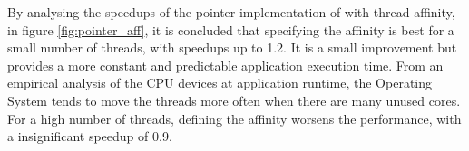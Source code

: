By analysing the speedups of the pointer implementation of \tth with thread affinity, in figure \ref{fig:pointer_aff}, it is concluded that specifying the affinity is best for a small number of threads, with speedups up to 1.2. It is a small improvement but provides a more constant and predictable application execution time. From an empirical analysis of the CPU devices at application runtime, the Operating System tends to move the threads more often when there are many unused cores. For a high number of threads, defining the affinity worsens the performance, with a insignificant speedup of 0.9.
